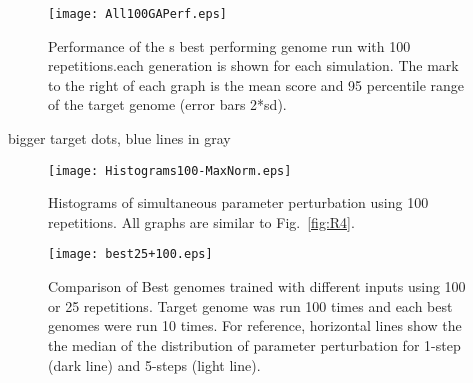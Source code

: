 \clearpage


\begin{figure}[tb!]
  \centering
  \texttt{[image: All100GAPerf.eps]}
  \caption{Performance of the {\GA}s best performing genome run with 100 repetitions.each
    generation is shown for each simulation. The mark to the right of
    each graph is the mean score and 95 percentile range of the target
    genome (error bars 2*sd).}\label{fig:R5}
\end{figure}
bigger target dots, blue lines in gray




\begin{figure}[tb!]
  \centering
  \texttt{[image: Histograms100-MaxNorm.eps]}  
  \caption{Histograms of simultaneous parameter perturbation using 100 repetitions. All graphs are similar to
    Fig.~\ref{fig:R4}. %
  }\label{fig:R6}
\end{figure}
\clearpage




\begin{figure}[tb!]
  \centering
  \texttt{[image: best25+100.eps]}
  \caption{Comparison of Best genomes trained with different inputs using 100 or
    25 repetitions.  Target genome was run 100 times and each {\GA} best genomes
    were run 10 times. For reference, horizontal lines show the the median of
    the distribution of parameter perturbation for 1-step (dark line) and
    5-steps (light line).}\label{fig:R7}
\end{figure}
